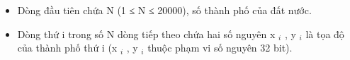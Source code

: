 \begin{itemize}
	\item Dòng đầu tiên chứa N (1 ≤ N ≤ 20000), số thành phố của đất nước.
	\item Dòng thứ i trong số N dòng tiếp theo chứa hai số nguyên x $_ i $ , y $_ i $ là tọa độ của thành phố thứ i (x $_ i $ , y $_ i $ thuộc phạm vi số nguyên 32 bit).
\end{itemize}